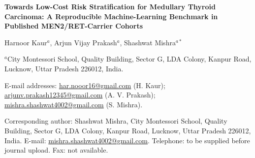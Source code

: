 \documentclass[12pt]{article}
\newcommand{\PaperTitle}{Towards Low-Cost Risk Stratification for Medullary Thyroid Carcinoma: A Reproducible Machine-Learning Benchmark in Published MEN2/RET-Carrier Cohorts}
\begin{document}
\begin{titlepage}
\centering
{\Large\bfseries \PaperTitle\par}
\vspace{1.0cm}
Harnoor Kaur$^{a}$, Arjun Vijay Prakash$^{a}$, Shashwat Mishra$^{a*}$\par
\vspace{0.5cm}
$^{a}$City Montessori School, Quality Building, Sector G, LDA Colony, Kanpur Road, Lucknow, Uttar Pradesh 226012, India.\par
\vspace{0.5cm}
E-mail addresses: \href{mailto:har.nooor16@gmail.com}{har.nooor16@gmail.com} (H. Kaur); \href{mailto:arjunv.prakash12345@gmail.com}{arjunv.prakash12345@gmail.com} (A. V. Prakash); \href{mailto:mishra.shashwat4002@gmail.com}{mishra.shashwat4002@gmail.com} (S. Mishra).\par
\vspace{0.5cm}
Corresponding author: Shashwat Mishra, City Montessori School, Quality Building, Sector G, LDA Colony, Kanpur Road, Lucknow, Uttar Pradesh 226012, India. E-mail: \href{mailto:mishra.shashwat4002@gmail.com}{mishra.shashwat4002@gmail.com}. Telephone: to be supplied before journal upload. Fax: not available.\par
\end{titlepage}
\end{document}
